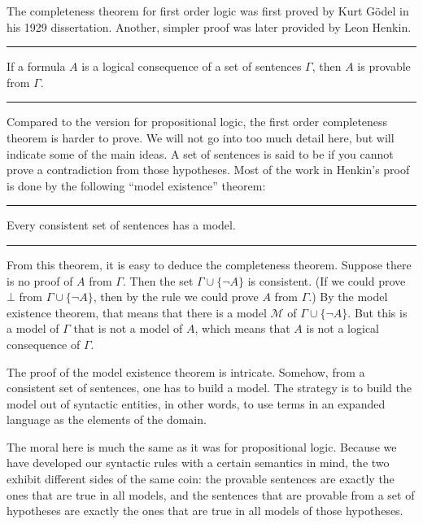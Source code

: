 \documentclass[letterpaper,10pt,english]{sphinxmanual}
\begin{document}
\sphinxAtStartPar
The completeness theorem for first order logic was first proved by Kurt Gödel in his 1929 dissertation. Another, simpler proof was later provided by Leon Henkin.


\bigskip\hrule\bigskip


\sphinxAtStartPar
{} If a formula \(A\) is a logical consequence of a set of sentences \(\Gamma\), then \(A\) is provable from \(\Gamma\).


\bigskip\hrule\bigskip


\sphinxAtStartPar
Compared to the version for propositional logic, the first order completeness theorem is harder to prove. We will not go into too much detail here, but will indicate some of the main ideas. A set of sentences is said to be  if you cannot prove a contradiction from those hypotheses. Most of the work in Henkin’s proof is done by the following “model existence” theorem:


\bigskip\hrule\bigskip


\sphinxAtStartPar
{} Every consistent set of sentences has a model.


\bigskip\hrule\bigskip


\sphinxAtStartPar
From this theorem, it is easy to deduce the completeness theorem. Suppose there is no proof of \(A\) from \(\Gamma\). Then the set \(\Gamma \cup \{ \neg A \}\) is consistent. (If we could prove \(\bot\) from \(\Gamma \cup \{ \neg A \}\), then by the  rule we could prove \(A\) from \(\Gamma\).) By the model existence theorem, that means that there is a model \({\mathcal M}\) of \(\Gamma \cup \{ \neg A \}\). But this is a model of \(\Gamma\) that is not a model of \(A\), which means that \(A\) is not a logical consequence of \(\Gamma\).

\sphinxAtStartPar
The proof of the model existence theorem is intricate. Somehow, from a consistent set of sentences, one has to build a model. The strategy is to build the model out of syntactic entities, in other words, to use terms in an expanded language as the elements of the domain.

\sphinxAtStartPar
The moral here is much the same as it was for propositional logic. Because we have developed our syntactic rules with a certain semantics in mind, the two exhibit different sides of the same coin: the provable sentences are exactly the ones that are true in all models, and the sentences that are provable from a set of hypotheses are exactly the ones that are true in all models of those hypotheses.
\end{document}
